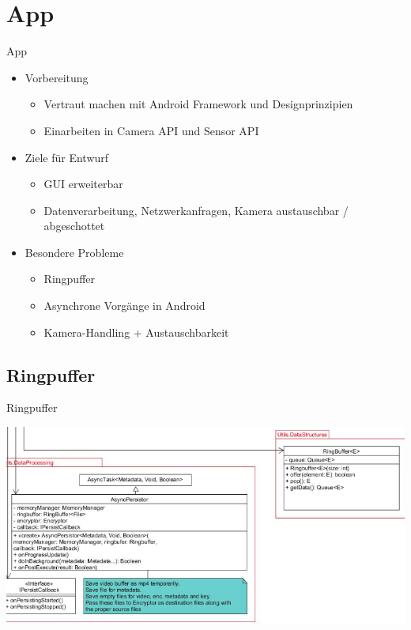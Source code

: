 \documentclass[19pt]{beamer}
\begin{document}
\section{App}
\begin{frame}{App}
	\begin{itemize}
    	\item Vorbereitung
		\begin{itemize}
			\item Vertraut machen mit Android Framework und Designprinzipien
			\pause
			\item Einarbeiten in Camera API und Sensor API
			\pause
		\end{itemize}
		\item Ziele für Entwurf
		\begin{itemize}
			\item GUI erweiterbar
			\pause
			\item Datenverarbeitung, Netzwerkanfragen, Kamera austauschbar / abgeschottet
			\pause
		\end{itemize}
		\item Besondere Probleme
		\begin{itemize}
			\item Ringpuffer
			\pause
			\item Asynchrone Vorgänge in Android
			\pause 
			\item Kamera-Handling + Austauschbarkeit
		\end{itemize}
	\end{itemize}
\end{frame}
\subsection{Ringpuffer}
\begin{frame}{Ringpuffer}
\begin{center}
\includegraphics[scale=0.3]{resources/ringbuffer_new.png}
\end{center}
\end{frame}
\end{document}
